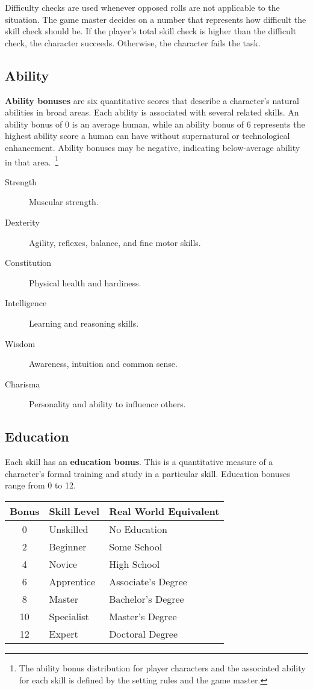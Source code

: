 \documentclass[11pt]{article}
\begin{document}
Difficulty checks are used whenever opposed rolls are not applicable to the situation.
The game master decides on a number that represents how difficult the skill check should be.
If the player's total skill check is higher than the difficult check, the character succeeds.
Otherwise, the character fails the task.

\subsection{Ability}
\textbf{Ability bonuses} are six quantitative scores that describe a character's natural abilities in broad areas.
Each ability is associated with several related skills.
An ability bonus of 0 is an average human, while an ability bonus of 6 represents the highest ability score a human can have without supernatural or technological enhancement.
Ability bonuses may be negative, indicating below-average ability in that area.\
\footnote{The ability bonus distribution for player characters and the associated ability for each skill is defined by the setting rules and the game master.}

\begin{description}
	\item[Strength]Muscular strength.
	\item[Dexterity]Agility, reflexes, balance, and fine motor skills.
	\item[Constitution]Physical health and hardiness.
	\item[Intelligence]Learning and reasoning skills.
	\item[Wisdom]Awareness, intuition and common sense.
	\item[Charisma]Personality and ability to influence others.
\end{description}

\subsection{Education}
Each skill has an \textbf{education bonus}.
This is a quantitative measure of a character's formal training and study in a particular skill.
Education bonuses range from 0 to 12.

\begin{center}
	\begin{tabular}{cll}
		Bonus & Skill Level & Real World Equivalent  \\
		\hline
		0     & Unskilled   & No Education           \\
		2     & Beginner    & Some School            \\
		4     & Novice      & High School            \\
		6     & Apprentice  & Associate's Degree     \\
		8     & Master      & Bachelor's Degree      \\
		10    & Specialist  & Master's Degree        \\
		12    & Expert      & Doctoral Degree        \\
	\end{tabular}
\end{center}
\end{document}
